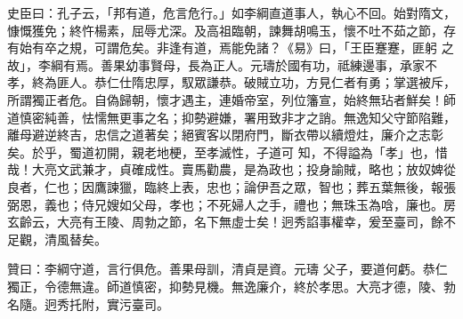 \begin{pinyinscope}
 史臣曰：孔子云，「邦有道，危言危行。」如李綱直道事人，執心不回。始對隋文，慷慨獲免；終忤楊素，屈辱尤深。及高祖臨朝，諫舞胡鳴玉，懷不吐不茹之節，存有始有卒之規，可謂危矣。非逢有道，焉能免諸？《易》曰，「王臣蹇蹇，匪躬
 之故」，李綱有焉。善果幼事賢母，長為正人。元璹於國有功，祗練邊事，承家不孝，終為匪人。恭仁仕隋忠厚，馭眾謙恭。破賊立功，方見仁者有勇；掌選被斥，所謂獨正者危。自偽歸朝，懷才遇主，連婚帝室，列位籓宣，始終無玷者鮮矣！師道慎密純善，怯懦無更事之名；抑勢避嫌，署用致非才之誚。無逸知父守節陷難，離母避逆終吉，忠信之道著矣；絕賓客以閉府門，斷衣帶以續燈炷，廉介之志彰矣。於乎，蜀道初開，親老地梗，至孝滅性，子道可
 知，不得謚為「孝」也，惜哉！大亮文武兼才，貞確成性。賣馬勸農，是為政也；投身諭賊，略也；放奴婢從良者，仁也；因鷹諫獵，臨終上表，忠也；論伊吾之眾，智也；葬五葉無後，報張弼恩，義也；侍兄嫂如父母，孝也；不死婦人之手，禮也；無珠玉為唅，廉也。房玄齡云，大亮有王陵、周勃之節，名下無虛士矣！迥秀諂事權幸，爰至臺司，餘不足觀，清風替矣。



 贊曰：李綱守道，言行俱危。善果母訓，清貞是資。元璹
 父子，要道何虧。恭仁獨正，令德無違。師道慎密，抑勢見機。無逸廉介，終於孝思。大亮才德，陵、勃名隨。迥秀托附，實污臺司。



\end{pinyinscope}